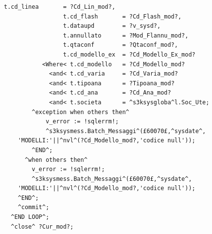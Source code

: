 \begin{lstlisting}[frame=single,style=base]
                 t.cd_linea       = ?Cd_Lin_mod?,
                 t.cd_flash       = ?Cd_Flash_mod?,
                 t.dataupd        = ?v_sysd?,
                 t.annullato      = ?Mod_Flannu_mod?,
                 t.qtaconf        = ?Qtaconf_mod?,
                 t.cd_modello_ex  = ?Cd_Modello_Ex_mod?
           <Where< t.cd_modello   = ?Cd_Modello_mod?
             <and< t.cd_varia     = ?Cd_Varia_mod?
             <and< t.tipoana      = ?Tipoana_mod?
             <and< t.cd_ana       = ?Cd_Ana_mod?
             <and< t.societa      = ^s3ksysgloba^l.Soc_Ute;
        ^exception when others then^
            v_error := !sqlerrm!;
            ^s3ksysmess.Batch_Messaggi^(£60070£,^sysdate^,
	'MODELLI:'||^nvl^(?Cd_Modello_mod?,'codice null'));
        ^END^;
      ^when others then^
        v_error := !sqlerrm!;
        ^s3ksysmess.Batch_Messaggi^(£60070£,^sysdate^,
	'MODELLI:'||^nvl^(?Cd_Modello_mod?,'codice null'));
    ^END^;
    ^commit^;
  ^END LOOP^;
  ^close^ ?Cur_mod?;
\end{lstlisting}

